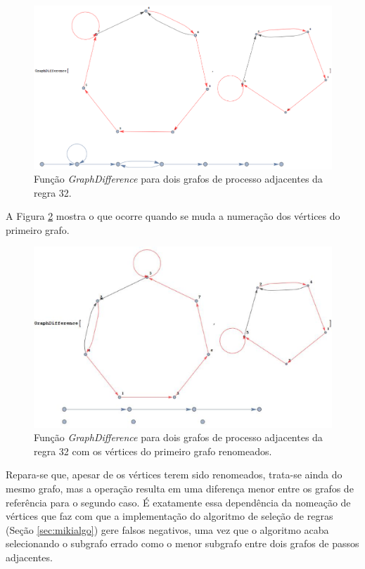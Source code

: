 \documentclass[12pt,a4paper]{article}
\begin{document}
\begin{figure}[htp]
\begin{center}
\includegraphics[scale=0.33]{img/GraphDifference1.eps}
\caption{Função \textit{GraphDifference} para dois grafos de processo
adjacentes da regra 32.}
\label{fig:gd1}
\end{center}
\end{figure}

A Figura \ref{fig:gd2} mostra o que ocorre quando se muda a numeração
dos vértices do primeiro grafo.

\begin{figure}[htp]
\begin{center}
\includegraphics[scale=0.37]{img/GraphDifference2.eps}
\caption{Função \textit{GraphDifference} para dois grafos de processo
adjacentes da regra 32 com os vértices do primeiro grafo renomeados.}
\label{fig:gd2}
\end{center}
\end{figure}

Repara-se que, apesar de os vértices terem sido renomeados, trata-se ainda do
mesmo grafo, mas a operação resulta em uma diferença
menor entre os grafos de referência para o segundo caso. É exatamente essa
dependência da nomeação de vértices que faz com que a implementação do
algoritmo de seleção de regras (Seção \ref{sec:mikialgo}) gere falsos negativos,
uma vez que o algoritmo acaba selecionando o subgrafo errado como o menor
subgrafo entre dois grafos de passos adjacentes.
\end{document}
